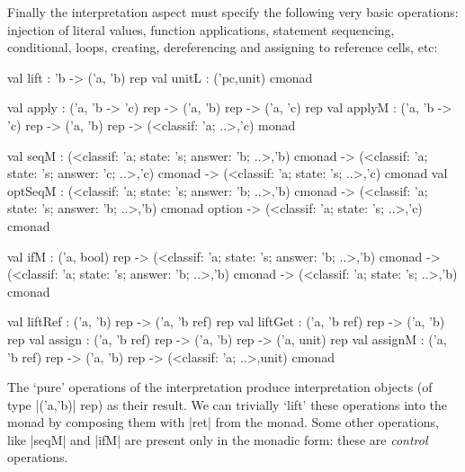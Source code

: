 \documentclass{elsart}
\begin{document}
Finally the interpretation aspect must specify the following very basic
operations: injection of literal values, function
applications, statement sequencing, conditional, loops, creating,
dereferencing and assigning to reference cells, etc:
\begin{code}
val lift  : 'b -> ('a, 'b) rep
val unitL : ('pc,unit) cmonad

val apply  : ('a, 'b -> 'c) rep -> ('a, 'b) rep -> ('a, 'c) rep
val applyM : ('a, 'b -> 'c) rep -> ('a, 'b) rep -> 
             (<classif: 'a; ..>,'c) monad

val seqM :
   (<classif: 'a; state: 's; answer: 'b; ..>,'b) cmonad ->
   (<classif: 'a; state: 's; answer: 'c; ..>,'c) cmonad ->
   (<classif: 'a; state: 's; ..>,'c) cmonad
val optSeqM : 
   (<classif: 'a; state: 's; answer: 'b; ..>,'b) cmonad ->
   (<classif: 'a; state: 's; answer: 'b; ..>,'b) cmonad option ->
   (<classif: 'a; state: 's; ..>,'c) cmonad

val ifM : ('a, bool) rep ->
   (<classif: 'a; state: 's; answer: 'b; ..>,'b) cmonad ->
   (<classif: 'a; state: 's; answer: 'b; ..>,'b) cmonad ->
   (<classif: 'a; state: 's; ..>,'b) cmonad

val liftRef : ('a, 'b) rep -> ('a, 'b ref) rep
val liftGet : ('a, 'b ref) rep -> ('a, 'b) rep
val assign  : ('a, 'b ref) rep -> ('a, 'b) rep -> ('a, unit) rep
val assignM : ('a, 'b ref) rep -> ('a, 'b) rep -> 
              (<classif: 'a; ..>,unit) cmonad
\end{code}

The `pure' operations of the interpretation produce interpretation
objects (of type |('a,'b)| rep) as their result. We can trivially
`lift' these operations into the monad by composing them with |ret| from
the monad. Some other operations, like |seqM| and |ifM| are present
only in the monadic form: these are \emph{control} operations.
\end{document}
